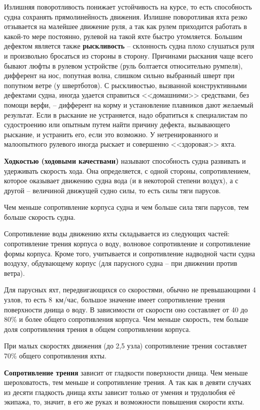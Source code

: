 \documentclass[a4paper, 12pt, twoside, final]{scrbook}
\begin{document}
Излишняя поворотливость понижает устойчивость на курсе, то есть способность судна сохранять прямолинейность движения. Излишне поворотливая яхта резко отзывается на малейшее движение руля, а так как рулем приходится работать в какой-то мере постоянно, рулевой на такой яхте быстро утомляется. Большим дефектом является также \textbf{рыскливость} \--- склонность судна плохо слушаться руля и произвольно бросаться из стороны в сторону. Причинами рыскания чаще всего бывают люфты в рулевом устройстве (руль болтается относительно румпеля), дифферент на нос, попутная волна, слишком сильно выбранный шверт при попутном ветре (у швертботов). С рыскливостью, вызванной конструктивными дефектами судна, иногда удается справиться <<домашними>> средствами, без помощи верфи, \--- дифферент на корму и установление плавников дают желаемый результат. Если в рыскание не устраняется, надо обратиться к специалистам по судостроению или опытным путем найти причину дефекта, вызывающего рыскание, и устранить его, если это возможно. У нетренированного и малоопытного рулевого иногда рыскает и совершенно <<здоровая>> яхта.

\textbf{Ходкостью (ходовыми качествами)} называют способность судна развивать и удерживать скорость хода. Она определяется, с одной стороны, сопротивлением, которое оказывает движению судна вода (и в некоторой степени воздух), а с другой \--- величиной движущей судно силы, то есть силы тяги парусов.

Чем меньше сопротивление корпуса судна и чем больше сила тяги парусов, тем больше скорость судна.

Сопротивление воды движению яхты складывается из следующих частей: сопротивление трения корпуса о воду, волновое сопротивление и сопротивление формы корпуса. Кроме того, учитывается и сопротивление надводной части судна воздуху, обдувающему корпус (для парусного судна \--- при движении против ветра).

Для парусных яхт, передвигающихся со скоростями, обычно не превышающими 4 узлов, то есть 8~км/час, большое значение имеет сопротивление трения поверхности днища о воду. В зависимости от скорости оно составляет от 40 до 80\% и более общего сопротивления корпуса. Чем меньше скорость, тем больше доля сопротивления трения в общем сопротивлении корпуса.

При малых скоростях движения (до 2,5 узла) сопротивление трения составляет 70\% общего сопротивления яхты.

\textbf{Сопротивление трения} зависит от гладкости поверхности днища. Чем меньше шероховатость, тем меньше и сопротивление трения. А так как в девяти случаях из десяти гладкость днища яхты зависит только от умения и трудолюбия её экипажа, то, значит, в его же руках и возможности повышения скорости яхты.
\end{document}
